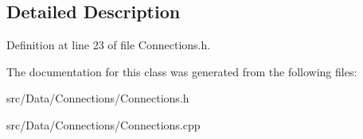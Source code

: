 \subsection{Detailed Description}


Definition at line 23 of file Connections.h.



The documentation for this class was generated from the following files:\begin{DoxyCompactItemize}
\item 
src/Data/Connections/Connections.h\item 
src/Data/Connections/Connections.cpp\end{DoxyCompactItemize}
